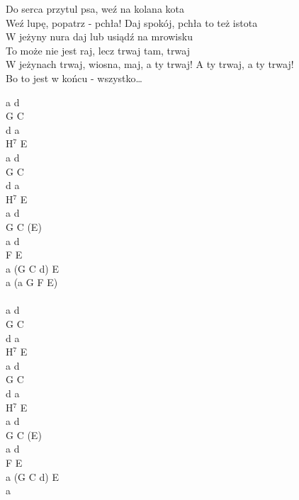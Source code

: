 \documentclass[a5paper, 10pt]{book}
\begin{document}
\begin{minipage}[t]{0.8\textwidth}
  \hspace*{5mm}Do serca przytul psa, weź na kolana kota\\
  \hspace*{5mm}Weź lupę, popatrz - pchła! Daj spokój, pchła to też istota\\
  \hspace*{5mm}W jeżyny nura daj lub usiądź na mrowisku\\
  \hspace*{5mm}To może nie jest raj, lecz trwaj tam, trwaj\\
  \hspace*{5mm}W jeżynach trwaj, wiosna, maj, a ty trwaj! A ty trwaj, a ty trwaj!\\
  \hspace*{5mm}Bo to jest w końcu - wszystko…\\
\end{minipage}
\begin{minipage}[t]{0.2\textwidth}
  a d\\
  G C\\
  d a\\
  H$^7$ E\\

  a d\\
  G C\\
  d a\\
  H$^7$ E\\

  a d\\
  G C (E)\\
  a d\\
  F E\\
  a (G C d) E\\
  a (a G F E)\\
  \vspace*{10mm}\\
  a d\\
  G C\\
  d a\\
  H$^7$ E\\

  a d\\
  G C\\
  d a\\
  H$^7$ E\\

  a d\\
  G C (E)\\
  a d\\
  F E\\
  a (G C d) E\\
  a \\
\end{minipage}
\end{document}
